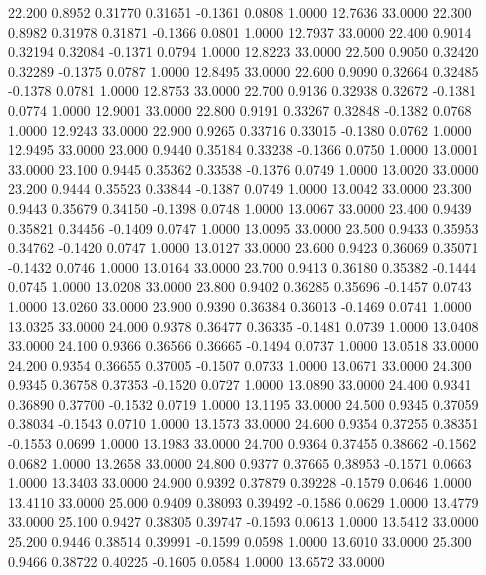   22.200   0.8952   0.31770   0.31651  -0.1361   0.0808   1.0000  12.7636  33.0000
  22.300   0.8982   0.31978   0.31871  -0.1366   0.0801   1.0000  12.7937  33.0000
  22.400   0.9014   0.32194   0.32084  -0.1371   0.0794   1.0000  12.8223  33.0000
  22.500   0.9050   0.32420   0.32289  -0.1375   0.0787   1.0000  12.8495  33.0000
  22.600   0.9090   0.32664   0.32485  -0.1378   0.0781   1.0000  12.8753  33.0000
  22.700   0.9136   0.32938   0.32672  -0.1381   0.0774   1.0000  12.9001  33.0000
  22.800   0.9191   0.33267   0.32848  -0.1382   0.0768   1.0000  12.9243  33.0000
  22.900   0.9265   0.33716   0.33015  -0.1380   0.0762   1.0000  12.9495  33.0000
  23.000   0.9440   0.35184   0.33238  -0.1366   0.0750   1.0000  13.0001  33.0000
  23.100   0.9445   0.35362   0.33538  -0.1376   0.0749   1.0000  13.0020  33.0000
  23.200   0.9444   0.35523   0.33844  -0.1387   0.0749   1.0000  13.0042  33.0000
  23.300   0.9443   0.35679   0.34150  -0.1398   0.0748   1.0000  13.0067  33.0000
  23.400   0.9439   0.35821   0.34456  -0.1409   0.0747   1.0000  13.0095  33.0000
  23.500   0.9433   0.35953   0.34762  -0.1420   0.0747   1.0000  13.0127  33.0000
  23.600   0.9423   0.36069   0.35071  -0.1432   0.0746   1.0000  13.0164  33.0000
  23.700   0.9413   0.36180   0.35382  -0.1444   0.0745   1.0000  13.0208  33.0000
  23.800   0.9402   0.36285   0.35696  -0.1457   0.0743   1.0000  13.0260  33.0000
  23.900   0.9390   0.36384   0.36013  -0.1469   0.0741   1.0000  13.0325  33.0000
  24.000   0.9378   0.36477   0.36335  -0.1481   0.0739   1.0000  13.0408  33.0000
  24.100   0.9366   0.36566   0.36665  -0.1494   0.0737   1.0000  13.0518  33.0000
  24.200   0.9354   0.36655   0.37005  -0.1507   0.0733   1.0000  13.0671  33.0000
  24.300   0.9345   0.36758   0.37353  -0.1520   0.0727   1.0000  13.0890  33.0000
  24.400   0.9341   0.36890   0.37700  -0.1532   0.0719   1.0000  13.1195  33.0000
  24.500   0.9345   0.37059   0.38034  -0.1543   0.0710   1.0000  13.1573  33.0000
  24.600   0.9354   0.37255   0.38351  -0.1553   0.0699   1.0000  13.1983  33.0000
  24.700   0.9364   0.37455   0.38662  -0.1562   0.0682   1.0000  13.2658  33.0000
  24.800   0.9377   0.37665   0.38953  -0.1571   0.0663   1.0000  13.3403  33.0000
  24.900   0.9392   0.37879   0.39228  -0.1579   0.0646   1.0000  13.4110  33.0000
  25.000   0.9409   0.38093   0.39492  -0.1586   0.0629   1.0000  13.4779  33.0000
  25.100   0.9427   0.38305   0.39747  -0.1593   0.0613   1.0000  13.5412  33.0000
  25.200   0.9446   0.38514   0.39991  -0.1599   0.0598   1.0000  13.6010  33.0000
  25.300   0.9466   0.38722   0.40225  -0.1605   0.0584   1.0000  13.6572  33.0000
